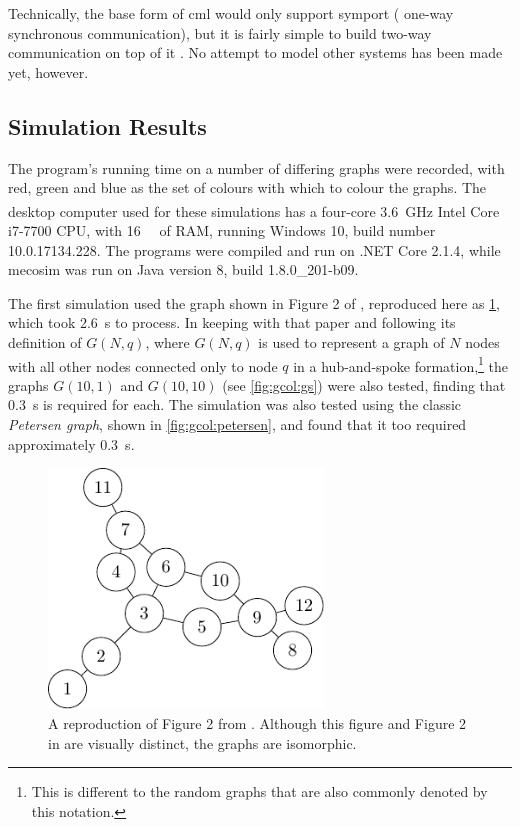 Technically, the base form of \gls{cml} would only support symport (\ie{} one-way synchronous communication), but it is fairly simple to build two-way communication on top of it \cite[ch.~6]{Reppy2007}.  No attempt to model other systems has been made yet, however.

\subsection{Simulation Results}
The program's running time on a number of differing graphs were recorded, with red, green and blue as the set of colours with which to colour the graphs.  The desktop computer used for these simulations has a four-core \qty{3.6}{\giga\hertz} Intel Core\textsuperscript{\textregistered} i7-7700 CPU, with \qty{16}{\gibi\byte} of RAM, running Windows 10, build number 10.0.17134.228.  The \fsharp{} programs were compiled and run on .NET Core 2.1.4, while \gls{mecosim} was run on Java version 8, build 1.8.0\_201-b09.

The first simulation used the graph shown in Figure 2 of \cite{Gheorghe2013}, reproduced here as \cref{fig:gcol:gheorghefig2}, which took \qty{2.6}{\second} to process.  In keeping with that paper and following its definition of \(G(N,q)\), where \(G(N,q)\) is used to represent a graph of \(N\) nodes with all other nodes connected only to node \(q\) in a hub-and-spoke formation,\footnote{This is different to the random graphs that are also commonly denoted by this notation.} the graphs \(G(10,1)\) and \(G(10,10)\) (see \cref{fig:gcol:gs}) were also tested, finding that \qty{0.3}{\second} is required for each.  The simulation was also tested using the classic \emph{Petersen graph}, shown in \cref{fig:gcol:petersen}, and found that it too required approximately \qty{0.3}{\second}.

\begin{figure}
    \centering
    \includegraphics[width=0.65\textwidth]{chapters/gcol/figs/gheorghe-figure-2-figure0.pdf}
    \caption[A reproduction of the graph in Figure 2 of \cite{Gheorghe2013}]{\label{fig:gcol:gheorghefig2}A reproduction of Figure 2 from \cite{Gheorghe2013}.  Although this figure and Figure 2 in \cite{Gheorghe2013} are visually distinct, the graphs are isomorphic.}
\end{figure}

